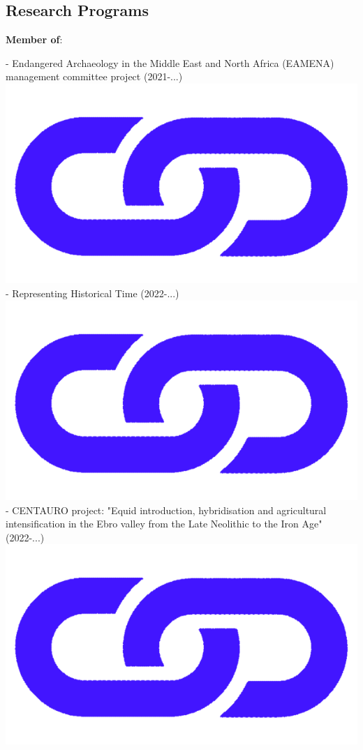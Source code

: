 \documentclass{article}
\begin{document}
\subsection*{Research Programs}

\textbf{Member of}:

- Endangered Archaeology in the Middle East and North Africa (EAMENA) management committee project (2021-...) \href{https://eamena.org/}{\includegraphics[scale=0.02]{link_darkblue.png}}\\
- Representing Historical Time (2022-...)\href{https://github.com/historical-time}{\includegraphics[scale=0.02]{link_darkblue.png}}\\
- CENTAURO project: "Equid introduction, hybridisation and agricultural intensification in the Ebro valley from the Late Neolithic to the Iron Age" (2022-...) \href{https://www.centaur-o.com/}{\includegraphics[scale=0.02]{link_darkblue.png}}\\
\end{document}
